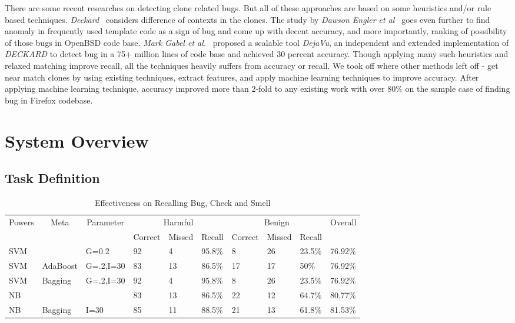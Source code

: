 \documentclass[nocopyrightspace]{sigplanconf}
\begin{document}
There are some recent researches on detecting clone related bugs. But all of these approaches are based on some heuristics and/or rule based techniques. \emph{Deckard}~\cite{Jiang2007} considers difference of contexts in the clones. The study by \emph{Dawson Engler et al}~\cite{Engler2001} goes even further to find anomaly in frequently used template code as a sign of bug and come up with decent accuracy, and more importantly, ranking of possibility of those bugs in OpenBSD code base. \emph{Mark Gabel et al.}~\cite{Gabel2010} proposed a scalable tool \emph{DejaVu}, an independent and extended implementation of \emph{DECKARD} to detect bug in a 75+ million lines of code base and achieved 30 percent accuracy. Though applying many such heuristics and relaxed matching improve recall, all the techniques heavily suffers from accuracy or recall. We took off where other methods left off - get near match clones by using existing techniques, extract features, and apply machine learning techniques to improve accuracy. After applying machine learning technique, accuracy improved more than 2-fold to any existing work with over $80\%$ on the sample case of finding bug in Firefox codebase.

\section{System Overview}
\subsection{Task Definition}

\begin{table}[htb!]
\centering
\begin{tabularx}{\textwidth}{|X|X|X|X|X|X|X|X|X|X|}
\hline
\multicolumn{1}{|c|}{\multirow{2}{*}{Powers}} & 
\multicolumn{1}{|c|}{\multirow{2}{*}{Meta}} & 
\multicolumn{1}{|c|}{\multirow{2}{*}{Parameter}} & 
\multicolumn{3}{|c|}{Harmful} & 
\multicolumn{3}{|c|}{Benign} & 
\multicolumn{1}{|c|}{\multirow{2}{*}{Overall}} \\
\cline{4-9}

& & & Correct & Missed & Recall & Correct & Missed & Recall & \\
\hline

SVM & & G=0.2 & 92 & 4 & 95.8\% & 8 & 26 & 23.5\% & 76.92\% \\
\hline
SVM & AdaBoost & G=.2,I=30 & 83 & 13 & 86.5\% & 17 & 17 & 50\% & 76.92\% \\
\hline
SVM	& Bagging& G=.2,I=30  & 92 & 4 & 95.8\% & 8 & 26 & 23.5\% & 76.92\% \\
\hline
NB & & & 83 & 13 & 86.5\% & 22 & 12 & 64.7\% & 80.77\% \\
\hline
NB & Bagging & I=30 & 85 & 11 & 88.5\% & 21 & 13 & 61.8\% & 81.53\% \\
\hline
\end{tabularx}
\caption{Effectiveness on Recalling Bug, Check and Smell}
\label{tab:dataset1}
\end{table}
\end{document}
